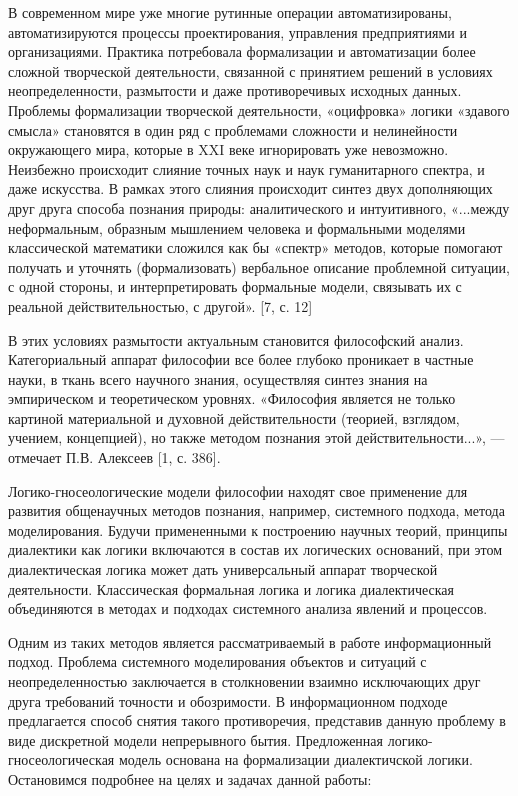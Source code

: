 \documentclass[a4paper,12pt]{report}
\begin{document}
В современном мире уже многие рутинные операции автоматизированы, автоматизируются процессы проектирования, управления предприятиями и организациями. Практика потребовала формализации и автоматизации более сложной творческой деятельности, связанной с принятием решений в условиях неопределенности, размытости и даже противоречивых исходных данных.  Проблемы формализации творческой деятельности, «оцифровка» логики «здавого смысла» становятся в один ряд с проблемами сложности и нелинейности окружающего мира, которые в XXI веке игнорировать уже невозможно. Неизбежно происходит слияние точных наук и наук гуманитарного спектра, и даже искусства. В рамках этого слияния происходит синтез двух дополняющих друг друга способа познания природы: аналитического и интуитивного, «...между неформальным, образным мышлением человека и формальными моделями классической математики сложился как бы «спектр» методов, которые помогают получать и уточнять (формализовать) вербальное описание проблемной ситуации, с одной стороны, и интерпретировать формальные модели, связывать их с реальной действительностью, с другой». [7, с. 12] 

В этих условиях размытости актуальным становится философский анализ. Категориальный аппарат философии  все более глубоко проникает в частные науки, в ткань всего научного знания, осуществляя синтез знания на эмпирическом и теоретическом уровнях. «Философия является не только картиной материальной и духовной действительности (теорией, взглядом, учением, концепцией), но также методом познания этой действительности...», — отмечает П.В. Алексеев [1, с. 386].

 Логико-гносеологические модели философии находят свое применение для развития общенаучных методов познания, например, системного подхода, метода моделирования. Будучи примененными к построению научных теорий, принципы диалектики как логики включаются в состав их логических оснований, при этом диалектическая логика может дать универсальный аппарат творческой деятельности.
Классическая формальная логика и логика диалектическая объединяются в методах и подходах системного анализа явлений и процессов.

 Одним из таких методов является рассматриваемый в работе информационный подход. Проблема системного моделирования объектов и ситуаций с неопределенностью заключается в столкновении взаимно исключающих друг друга требований точности и обозримости. В информационном подходе предлагается способ снятия такого противоречия, представив данную проблему в виде дискретной модели непрерывного бытия. Предложенная логико-гносеологическая модель основана на формализации диалектичской логики. Остановимся подробнее на целях и задачах данной работы:
\end{document}
